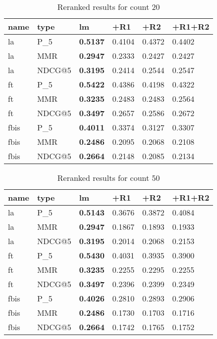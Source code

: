 \documentclass{sig-alternate}
\begin{document}
\begin{table}[h!]
\centering
\begin{tabular}{|l|l|l|l|l|l|}
\hline
name & type  & lm & +R1 & +R2 & +R1+R2 \\ \hline \hline
la & P\_5 & \textbf{0.5137} & 0.4104 & 0.4372 & 0.4402 \\ \hline 
la & MMR & \textbf{0.2947} & 0.2333 & 0.2427 & 0.2427 \\ \hline
la & NDCG@5 & \textbf{0.3195} & 0.2414 & 0.2544 & 0.2547 \\ \hline \hline
ft & P\_5 & \textbf{0.5422} & 0.4386 & 0.4198 & 0.4322 \\ \hline 
ft & MMR & \textbf{0.3235} & 0.2483 & 0.2483 & 0.2564 \\ \hline
ft & NDCG@5 & \textbf{0.3497} & 0.2657 & 0.2586 & 0.2672 \\ \hline \hline
fbis & P\_5 & \textbf{0.4011} & 0.3374 & 0.3127 & 0.3307 \\ \hline 
fbis & MMR & \textbf{0.2486} & 0.2095 & 0.2068 & 0.2108 \\ \hline
fbis & NDCG@5 & \textbf{0.2664} & 0.2148 & 0.2085 & 0.2134 \\ \hline
\end{tabular}
\caption{Reranked results for count 20}
\end{table}

\begin{table}[h!]
\centering
\begin{tabular}{|l|l|l|l|l|l|}
\hline
name & type  & lm & +R1 & +R2 & +R1+R2 \\ \hline \hline
la & P\_5 & \textbf{0.5143} & 0.3676 & 0.3872 & 0.4084 \\ \hline 
la & MMR & \textbf{0.2947} & 0.1867 & 0.1893 & 0.1933 \\ \hline
la & NDCG@5 & \textbf{0.3195} & 0.2014 & 0.2068 & 0.2153 \\ \hline \hline
ft & P\_5 & \textbf{0.5430} & 0.4031 & 0.3935 & 0.3900 \\ \hline 
ft & MMR & \textbf{0.3235} & 0.2255 & 0.2295 & 0.2255 \\ \hline
ft & NDCG@5 & \textbf{0.3497} & 0.2396 & 0.2399 & 0.2349 \\ \hline \hline
fbis & P\_5 & \textbf{0.4026} & 0.2810 & 0.2893 & 0.2906 \\ \hline 
fbis & MMR & \textbf{0.2486} & 0.1730 & 0.1703 & 0.1716 \\ \hline
fbis & NDCG@5 & \textbf{0.2664} & 0.1742 & 0.1765 & 0.1752 \\ \hline
\end{tabular}
\caption{Reranked results for count 50}
\end{table}
\end{document}
